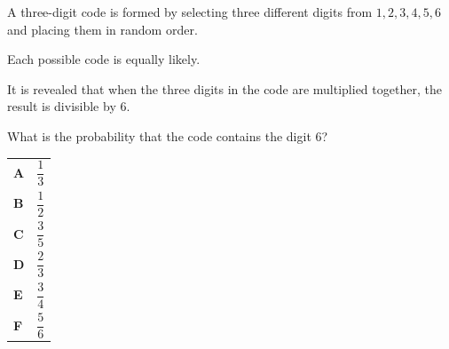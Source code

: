\documentclass[11pt,a4paper]{article}
\begin{document}
\clearpage
\thispagestyle{djspaper}
\vspace*{8pt}
\begin{enumerate}[label=\textbf{\arabic*.},leftmargin=*,itemsep=0pt,start=11]
A three-digit code is formed by selecting three different digits from $1,2,3,4,5,6$ and placing them in random order. 

Each possible code is equally likely.

It is revealed that when the three digits in the code are multiplied together, the result is divisible by $6$.

What is the probability that the code contains the digit $6$?

\par\vspace*{12pt}
\begin{tabularx}{\linewidth}{@{}>{\bfseries}l Y@{}}
A &
$\dfrac{1}{3}$
\\[0.8em]
B &
$\dfrac{1}{2}$
\\[0.8em]
C &
$\dfrac{3}{5}$
\\[0.8em]
D &
$\dfrac{2}{3}$
\\[0.8em]
E &
$\dfrac{3}{4}$
\\[0.8em]
F &
$\dfrac{5}{6}$
\\
\end{tabularx}
\end{enumerate}
\clearpage
\thispagestyle{djspaper}
\vspace*{8pt}
\end{document}
